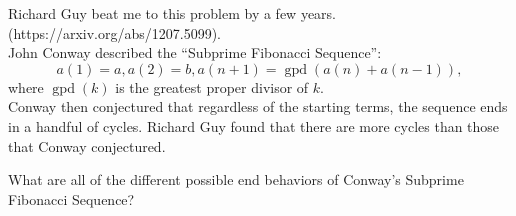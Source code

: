 \documentclass{article}
\begin{document}
  Richard Guy beat me to this problem by a few years. (https://arxiv.org/abs/1207.5099).\\
  John Conway described the ``Subprime Fibonacci Sequence'': \[
    a(1) = a, a(2) = b, a(n + 1) = \operatorname{gpd}(a(n) + a(n - 1)),
  \] where $\operatorname{gpd}(k)$ is the greatest proper divisor of $k$.\\
  Conway then conjectured that regardless of the starting terms, the sequence
  ends in a handful of cycles. Richard Guy found that there are more cycles than
  those that Conway conjectured.

\begin{question}
  What are all of the different possible end behaviors of
  Conway's Subprime Fibonacci Sequence?
\end{question}
\end{document}
